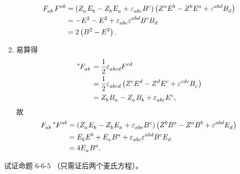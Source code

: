 \begin{xiti}
\begin{zm}
\begin{enumerate}[label=(\alph*)]
\begin{equation*}
\begin{split}
						\tensor{F}{_a_b} \tensor{F}{^a^b} &= \left( \tensor{Z}{_a} \tensor{E}{_b} - \tensor{Z}{_b} \tensor{E}{_a} + \tensor{\varepsilon}{_a_b_c} \tensor{B}{^c} \right) \left( \tensor{Z}{^a} \tensor{E}{^b} - \tensor{Z}{^b} \tensor{E}{^a} + \tensor{\varepsilon}{^a^b^d} \tensor{B}{_d} \right)\\
						&= -E^2 - E^2 + \tensor{\varepsilon}{_a_b_c} \tensor{\varepsilon}{^a^b^d} \tensor{B}{^c} \tensor{B}{_d}\\
						&= 2 \left( B^2 - E^2 \right).
					\end{split}
				\end{equation*}
				\item 易算得
				\begin{equation}
					\begin{split}
						\tensor[^*]{F}{_a_b} &= \frac{1}{2} \tensor{\varepsilon}{_a_b_c_d} \tensor{F}{^c^d}\\
						&= \frac{1}{2} \tensor{\varepsilon}{_a_b_c_d} \left( \tensor{Z}{^c} \tensor{E}{^d} - \tensor{Z}{^d} \tensor{E}{^c} + \tensor{\varepsilon}{^c^d^e} \tensor{B}{_e} \right)\\
						&= \tensor{Z}{_b}\tensor{B}{_a} - \tensor{Z}{_a} \tensor{B}{_b} + \tensor{\varepsilon}{_a_b_c} \tensor{E}{^c},\label{eq-*F}
					\end{split}
				\end{equation}
				故
				\begin{equation*}
					\begin{split}
						\tensor{F}{_a_b} \tensor[^*]{F}{^a^b} &=  \left( \tensor{Z}{_a} \tensor{E}{_b} - \tensor{Z}{_b} \tensor{E}{_a} + \tensor{\varepsilon}{_a_b_c} \tensor{B}{^c} \right) \left( \tensor{Z}{^b}\tensor{B}{^a} - \tensor{Z}{^a} \tensor{B}{^b} + \tensor{\varepsilon}{^a^b^d} \tensor{E}{_d} \right)\\
						&= \tensor{E}{_b} \tensor{E}{^b} + \tensor{E}{_a} \tensor{B}{^a} + \tensor{\varepsilon}{_a_b_c} \tensor{\varepsilon}{^a^b^d} \tensor{B}{^c} \tensor{E}{_d}\\
						&= 4 \tensor{E}{_a} \tensor{B}{^a}.
					\end{split}
				\end{equation*}
			\end{enumerate}
		\end{zm}

	\item 试证命题 6-6-5 （只需证后两个麦氏方程）。
	

\end{xiti}

